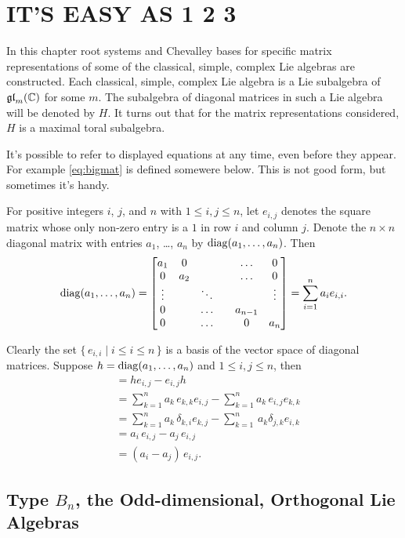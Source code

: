\chapter{IT'S EASY AS 1 2 3}

In this chapter root systems and Chevalley bases for specific matrix
representations of some of the classical, simple, complex Lie algebras are
constructed. Each classical, simple, complex Lie algebra is a Lie subalgebra
of $\mathfrak {gl}_m({\mathbb C})$ for some $m$. The subalgebra of diagonal matrices in such
a Lie algebra will be denoted by $H$. It turns out that for the matrix
representations considered, $H$ is a maximal toral subalgebra.

It's possible to refer to displayed equations at any time, even before they
appear. For example \cref{eq:bigmat} is defined somewere below. This is not
good form, but sometimes it's handy.

For positive integers $i$, $j$, and $n$ with $1\leq i,j\leq n$, let
$e_{i,j}$ denotes the square matrix whose only non-zero entry is a $1$ in
row $i$ and column $j$.  Denote the $n\times n$ diagonal matrix with entries
$a_1$, \dots, $a_n$ by ${\operatorname{diag}( a_1,\dots,a_n)}$. Then
\[
{\operatorname{diag}( a_1,\dots,a_n)}=
\begin{bmatrix}
  a_1&0&&&\dots&0 \\ 0&a_2&&&\dots&0 \\
  \vdots&&\ddots&&&\vdots \\ 0&&\dots&&a_{n-1}& \\ 0&&\dots&&0 &a_n
\end{bmatrix}
= \sum_{i=1}^n a_i e_{i,i}.
\]

Clearly the set $\{\, e_{i,i}\mid i\leq i\leq n\,\}$ is a basis of the
vector space of diagonal matrices. Suppose $h={\operatorname{diag}(a_1,\dots,a_n)}$ and $1\leq
i,j\leq n$, then
\begin{align*} 
  [h, e_{i,j}] &= he_{i,j} -e_{i,j} h\\
  &= \sum_{k=1}^n a_k\,e_{k,k} e_{i,j} -\sum_{k=1}^n a_k\, e_{i,j}e_{k,k}\\
  &= \sum_{k=1}^n a_k\, \delta_{k,i}e_{k,j} - \sum_{k=1}^n \, a_k
  \delta_{j,k} e_{i,k} \\
  &= a_i\, e_{i,j} - a_j\, e_{i,j}\\
  &= (a_i-a_j)\, e_{i,j}.
\end{align*}

\section{Type \texorpdfstring{$B_n$}{Bn}, the Odd-dimensional, Orthogonal
  Lie Algebras}

